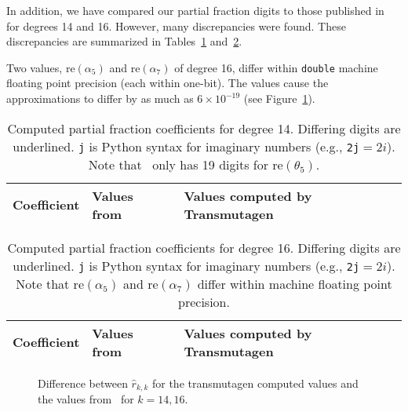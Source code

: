 In addition, we have compared our partial fraction digits to those published
in~\cite{pusa2012correction} for degrees 14 and 16. However, many
discrepancies were found. These discrepancies are summarized in
Tables~\ref{table:pusa-degree-14} and~\ref{table:pusa-degree-16}.

Two values, $\mathrm{re}(\alpha_5)$ and $\mathrm{re}(\alpha_7)$ of degree 16,
differ within \texttt{double} machine floating point precision (each within
one-bit). The values cause the approximations to differ by as much as
$6\times10^{-19}$ (see Figure~\ref{fig:pusa-differences}).

\setul{}{1pt}

\begin{table}[h!]
\centering
\begin{tabular}{ r b{1.8in} b{1.8in} }
Coefficient & Values from~\cite{pusa2012correction} & Values computed by Transmutagen \\
\midrule

\bottomrule
\end{tabular}
\caption{Computed partial fraction coefficients for degree 14. Differing
  digits are underlined. \texttt{j} is Python syntax for imaginary numbers
  (e.g., \texttt{2j}$=2i$). Note that~ only has 19
  digits for $\mathrm{re}(\theta_5)$.}
\label{table:pusa-degree-14}
\end{table}

\begin{table}[h!]
\centering
\begin{tabular}{ r b{1.8in} b{1.8in} }
Coefficient & Values from~\cite{pusa2012correction} & Values computed by Transmutagen \\
\midrule

\bottomrule
\end{tabular}
\caption{Computed partial fraction coefficients for degree 16. Differing
  digits are underlined. \texttt{j} is Python syntax for imaginary numbers
  (e.g., \texttt{2j}$=2i$). Note that $\mathrm{re}(\alpha_5)$ and
  $\mathrm{re}(\alpha_7)$ differ within machine floating point
  precision.}
\label{table:pusa-degree-16}
\end{table}

\begin{figure}[!ht]
\centering
\resizebox{0.9\textwidth}{!}{}
\caption{Difference between $\hat{r}_{k,k}$ for the transmutagen computed
  values and the values from~ for $k=14,16$.}
\label{fig:pusa-differences}
\end{figure}

